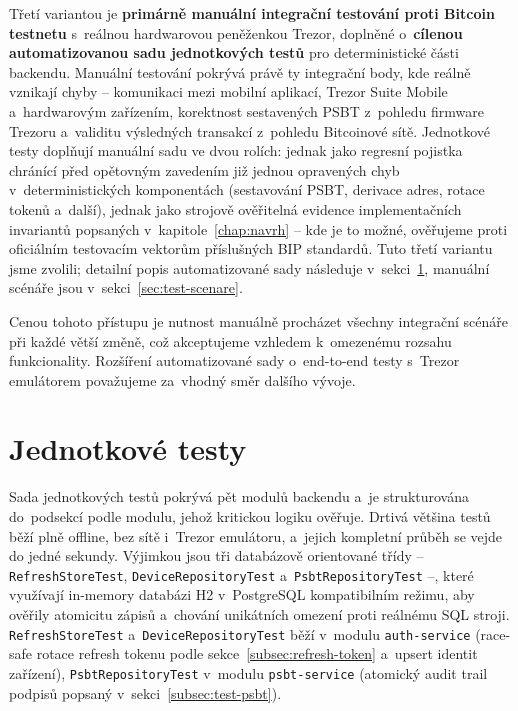 Třetí variantou je \textbf{primárně manuální integrační testování
proti Bitcoin testnetu} s~reálnou hardwarovou peněženkou Trezor,
doplněné o~\textbf{cílenou automatizovanou sadu jednotkových testů}
pro deterministické části backendu. Manuální
testování pokrývá právě ty integrační body, kde reálně vznikají chyby --
komunikaci mezi mobilní aplikací, Trezor Suite Mobile a~hardwarovým
zařízením, korektnost sestavených PSBT z~pohledu firmware Trezoru
a~validitu výsledných transakcí z~pohledu Bitcoinové sítě.
Jednotkové testy doplňují manuální sadu ve dvou rolích: jednak jako
regresní pojistka chránící před opětovným zavedením již jednou
opravených chyb v~deterministických komponentách (sestavování PSBT,
derivace adres, rotace tokenů a~další), jednak jako strojově
ověřitelná evidence implementačních invariantů popsaných
v~kapitole~\ref{chap:navrh} -- kde je to možné, ověřujeme proti
oficiálním testovacím vektorům příslušných BIP standardů. Tuto
třetí variantu jsme zvolili; detailní popis automatizované sady
následuje v~sekci~\ref{sec:test-unit}, manuální scénáře jsou
v~sekci~\ref{sec:test-scenare}.

Cenou tohoto přístupu je nutnost manuálně procházet všechny integrační
scénáře při každé větší změně, což akceptujeme vzhledem k~omezenému
rozsahu funkcionality. Rozšíření automatizované sady o~end-to-end
testy s~Trezor emulátorem považujeme za~vhodný směr dalšího vývoje.

\section{Jednotkové testy}
\label{sec:test-unit}

Sada jednotkových testů pokrývá pět modulů backendu a~je strukturována
do~podsekcí podle modulu, jehož kritickou logiku ověřuje. Drtivá
většina testů běží plně offline, bez sítě i~Trezor emulátoru,
a~jejich kompletní průběh se vejde do jedné sekundy. Výjimkou jsou
tři databázově orientované třídy -- \texttt{Refresh\-StoreTest},
\texttt{Device\-RepositoryTest} a~\texttt{PsbtRepositoryTest} --,
které využívají in-memory databázi H2 v~PostgreSQL kompatibilním režimu,
aby ověřily atomicitu zápisů a~chování unikátních omezení proti reálnému
SQL stroji. \texttt{Refresh\-StoreTest} a~\texttt{Device\-RepositoryTest}
běží v~modulu \texttt{auth-service} (race-safe rotace refresh tokenu
podle sekce~\ref{subsec:refresh-token} a~upsert identit zařízení),
\texttt{PsbtRepositoryTest} v~modulu \texttt{psbt-service} (atomický
audit trail podpisů popsaný v~sekci~\ref{subsec:test-psbt}).

